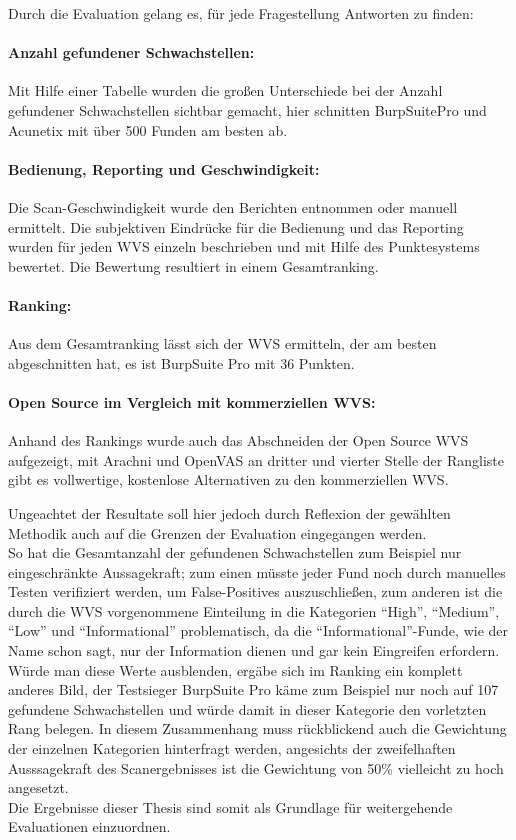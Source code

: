 \documentclass[12pt,oneside,a4paper,parskip]{scrbook}
\begin{document}
Durch die Evaluation gelang es, für jede Fragestellung Antworten zu finden:
\paragraph{Anzahl gefundener Schwachstellen:}
Mit Hilfe einer Tabelle wurden die großen Unterschiede bei der Anzahl gefundener Schwachstellen sichtbar gemacht, hier schnitten BurpSuitePro und Acunetix mit über 500 Funden am besten ab.
\paragraph{Bedienung, Reporting und Geschwindigkeit:}
Die Scan-Geschwindigkeit wurde den Berichten entnommen oder manuell ermittelt. Die subjektiven Eindrücke für die Bedienung und das Reporting wurden für jeden WVS einzeln beschrieben und mit Hilfe des Punktesystems bewertet. Die Bewertung resultiert in einem Gesamtranking.
\paragraph{Ranking:} Aus dem Gesamtranking lässt sich der WVS ermitteln, der am besten abgeschnitten hat, es ist BurpSuite Pro mit 36 Punkten.
\paragraph{Open Source im Vergleich mit kommerziellen WVS:}
Anhand des Rankings wurde auch das Abschneiden der Open Source WVS aufgezeigt, mit Arachni und OpenVAS an dritter und vierter Stelle der Rangliste gibt es vollwertige, kostenlose Alternativen zu den kommerziellen WVS.

Ungeachtet der Resultate soll hier jedoch durch Reflexion der gewählten Methodik auch auf die Grenzen der Evaluation eingegangen werden.\\
So hat die Gesamtanzahl der gefundenen Schwachstellen zum Beispiel nur eingeschränkte Aussagekraft; zum einen müsste jeder Fund noch durch manuelles Testen verifiziert werden, um False-Positives auszuschließen, zum anderen ist die durch die WVS vorgenommene Einteilung in die Kategorien ``High'', ``Medium'', ``Low'' und ``Informational'' problematisch, da die ``Informational''-Funde, wie der Name schon sagt, nur der Information dienen und gar kein Eingreifen erfordern. Würde man diese Werte ausblenden, ergäbe sich im Ranking ein komplett anderes Bild, der Testsieger BurpSuite Pro käme zum Beispiel nur noch auf 107 gefundene Schwachstellen und würde damit in dieser Kategorie den vorletzten Rang belegen. In diesem Zusammenhang muss rückblickend auch die Gewichtung der einzelnen Kategorien hinterfragt werden, angesichts der zweifelhaften Ausssagekraft des Scanergebnisses ist die Gewichtung von 50\% vielleicht zu hoch angesetzt. \\
Die Ergebnisse dieser Thesis sind somit als Grundlage für weitergehende Evaluationen einzuordnen.
\end{document}

